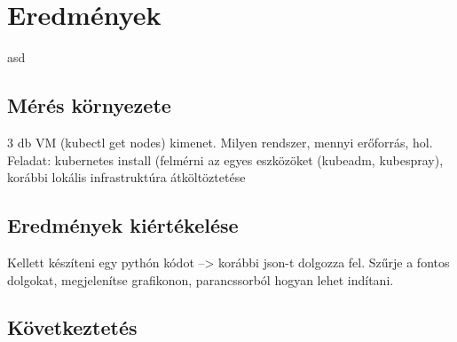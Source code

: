 \chapter{Eredmények}
\label{sec:results}

asd

\section{Mérés környezete}
3 db VM (kubectl get nodes) kimenet. Milyen rendszer, mennyi erőforrás, hol. Feladat: kubernetes install (felmérni az egyes eszközöket (kubeadm, kubespray), korábbi lokális infrastruktúra átköltöztetése  


\section{Eredmények kiértékelése}
Kellett készíteni egy pythón kódot --> korábbi json-t dolgozza fel. Szűrje a fontos dolgokat, megjelenítse grafikonon, parancssorból hogyan lehet indítani.

\section{Következtetés}
